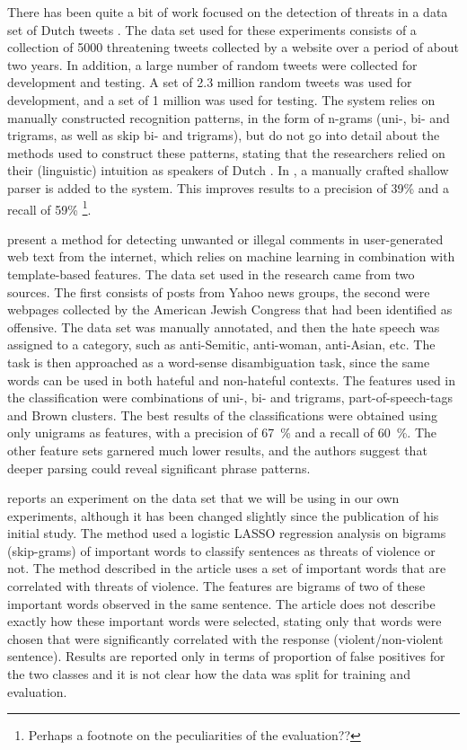 \documentclass[11pt,letterpaper]{article}
\newcommand{\tovs}{threats of violence}
\begin{document}
There has been quite a bit of work focused on the detection of threats
in a data set of Dutch tweets \cite{nellngram2013,nellshallow2013}.
The data set used for these experiments consists of a collection of 5000
threatening tweets collected by a website over a period of about two
years. In addition, a large number of random tweets were collected for
development and testing. A set of 2.3 million random tweets was used
for development, and a set of 1 million was used for testing. 
The system relies on manually constructed recognition patterns, in the
form of n-grams (uni-, bi- and trigrams, as well as skip bi- and
trigrams), but do not go into detail about the methods used to
construct these patterns, stating that the researchers relied on their
(linguistic) intuition as speakers of Dutch \cite{nellngram2013}. In
, a manually crafted shallow parser is added
to the system. This improves results to a precision of 39\% and a
recall of 59\% \footnote{Perhaps a footnote on the peculiarities of the evaluation??}.

 present a method for detecting unwanted or
illegal comments in user-generated web text from the internet, which
relies on machine learning in combination with template-based
features. The data set used in the research came from two sources. The
first consists of posts from Yahoo news groups, the second were
webpages collected by the American Jewish Congress that had been
identified as offensive. The data set was manually annotated, and then
the hate speech was assigned to a category, such as anti-Semitic,
anti-woman, anti-Asian, etc. The task is then approached as a
word-sense disambiguation task, since the same words can be used in
both hateful and non-hateful contexts. The features used in the
classification were combinations of uni-, bi- and trigrams,
part-of-speech-tags and Brown clusters.  The best results of the
classifications were obtained using only unigrams as features, with a
precision of 67~\% and a recall of 60~\%. The other feature sets
garnered much lower results, and the authors suggest that deeper
parsing could reveal significant phrase patterns.

 reports an experiment on the data set that we
will be using in our own experiments, although it has been changed
slightly since the publication of his initial study. The method used a
logistic LASSO regression analysis on bigrams (skip-grams) of
important words to classify sentences as \tovs{} or not.
The method described in the article uses a set of important words that
are correlated with threats of violence. The features are bigrams of
two of these important words observed in the same sentence. The
article does not describe exactly how these important words were
selected, stating only that words were chosen that were significantly
correlated with the response (violent/non-violent sentence). Results are reported only in terms of proportion of false positives for the two classes and it is not clear how the data was split for training and evaluation.
\end{document}
